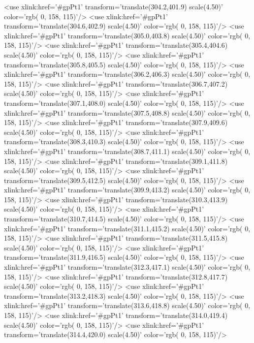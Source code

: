 	<use xlink:href='#gpPt1' transform='translate(304.2,401.9) scale(4.50)' color='rgb(  0, 158, 115)'/>
	<use xlink:href='#gpPt1' transform='translate(304.6,402.9) scale(4.50)' color='rgb(  0, 158, 115)'/>
	<use xlink:href='#gpPt1' transform='translate(305.0,403.8) scale(4.50)' color='rgb(  0, 158, 115)'/>
	<use xlink:href='#gpPt1' transform='translate(305.4,404.6) scale(4.50)' color='rgb(  0, 158, 115)'/>
	<use xlink:href='#gpPt1' transform='translate(305.8,405.5) scale(4.50)' color='rgb(  0, 158, 115)'/>
	<use xlink:href='#gpPt1' transform='translate(306.2,406.3) scale(4.50)' color='rgb(  0, 158, 115)'/>
	<use xlink:href='#gpPt1' transform='translate(306.7,407.2) scale(4.50)' color='rgb(  0, 158, 115)'/>
	<use xlink:href='#gpPt1' transform='translate(307.1,408.0) scale(4.50)' color='rgb(  0, 158, 115)'/>
	<use xlink:href='#gpPt1' transform='translate(307.5,408.8) scale(4.50)' color='rgb(  0, 158, 115)'/>
	<use xlink:href='#gpPt1' transform='translate(307.9,409.6) scale(4.50)' color='rgb(  0, 158, 115)'/>
	<use xlink:href='#gpPt1' transform='translate(308.3,410.3) scale(4.50)' color='rgb(  0, 158, 115)'/>
	<use xlink:href='#gpPt1' transform='translate(308.7,411.1) scale(4.50)' color='rgb(  0, 158, 115)'/>
	<use xlink:href='#gpPt1' transform='translate(309.1,411.8) scale(4.50)' color='rgb(  0, 158, 115)'/>
	<use xlink:href='#gpPt1' transform='translate(309.5,412.5) scale(4.50)' color='rgb(  0, 158, 115)'/>
	<use xlink:href='#gpPt1' transform='translate(309.9,413.2) scale(4.50)' color='rgb(  0, 158, 115)'/>
	<use xlink:href='#gpPt1' transform='translate(310.3,413.9) scale(4.50)' color='rgb(  0, 158, 115)'/>
	<use xlink:href='#gpPt1' transform='translate(310.7,414.5) scale(4.50)' color='rgb(  0, 158, 115)'/>
	<use xlink:href='#gpPt1' transform='translate(311.1,415.2) scale(4.50)' color='rgb(  0, 158, 115)'/>
	<use xlink:href='#gpPt1' transform='translate(311.5,415.8) scale(4.50)' color='rgb(  0, 158, 115)'/>
	<use xlink:href='#gpPt1' transform='translate(311.9,416.5) scale(4.50)' color='rgb(  0, 158, 115)'/>
	<use xlink:href='#gpPt1' transform='translate(312.3,417.1) scale(4.50)' color='rgb(  0, 158, 115)'/>
	<use xlink:href='#gpPt1' transform='translate(312.8,417.7) scale(4.50)' color='rgb(  0, 158, 115)'/>
	<use xlink:href='#gpPt1' transform='translate(313.2,418.3) scale(4.50)' color='rgb(  0, 158, 115)'/>
	<use xlink:href='#gpPt1' transform='translate(313.6,418.8) scale(4.50)' color='rgb(  0, 158, 115)'/>
	<use xlink:href='#gpPt1' transform='translate(314.0,419.4) scale(4.50)' color='rgb(  0, 158, 115)'/>
	<use xlink:href='#gpPt1' transform='translate(314.4,420.0) scale(4.50)' color='rgb(  0, 158, 115)'/>
